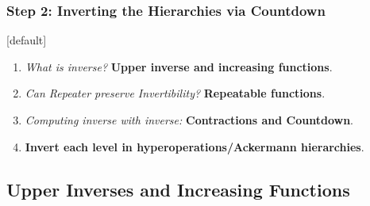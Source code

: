 \begin{frame}
\frametitle{Step 2: Inverting the Hierarchies via \textbf{Countdown}}
[default]

\begin{enumerate}[\bfseries 1.]
	\itemsep 3ex
	\pause
	\item<come@6->
	\emph{What is inverse?} \textbf{Upper inverse and increasing functions}.
	
	\item<3->
	\emph{Can Repeater preserve Invertibility?} \textbf{Repeatable functions}.
	
	\item<4->
	\emph{Computing inverse with inverse:} \textbf{Contractions and Countdown}.
	
	\item<5->
	\textbf{Invert each level in hyperoperations/Ackermann hierarchies}.
\end{enumerate}
\end{frame}


\subsection{Upper Inverses and Increasing Functions}

